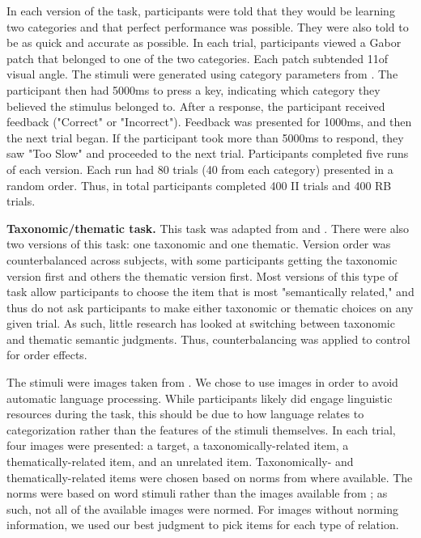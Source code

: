 \documentclass[../dissertation.tex]{subfiles}
\begin{document}
In each version of the task, participants were told that they would be learning two categories and that perfect performance was possible. They were also told to be as quick and accurate as possible. In each trial, participants viewed a Gabor patch that belonged to one of the two categories. Each patch subtended 11\degree of visual angle. The stimuli were generated using category parameters from \citet{Maddox2003}. The participant then had 5000ms to press a key, indicating which category they believed the stimulus belonged to. After a response, the participant received feedback ("Correct" or "Incorrect"). Feedback was presented for 1000ms, and then the next trial began. If the participant took more than 5000ms to respond, they saw "Too Slow" and proceeded to the next trial. Participants completed five runs of each version. Each run had 80 trials (40 from each category) presented in a random order. Thus, in total participants completed 400 II trials and 400 RB trials. \par
\textbf{Taxonomic/thematic task.} This task was adapted from \citet{Murphy2001} and \citet{Kalenine2009}. There were also two versions of this task: one taxonomic and one thematic. Version order was counterbalanced across subjects, with some participants getting the taxonomic version first and others the thematic version first. Most versions of this type of task allow participants to choose the item that is most "semantically related," and thus do not ask participants to make either taxonomic or thematic choices on any given trial. As such, little research has looked at switching between taxonomic and thematic semantic judgments. Thus, counterbalancing was applied to control for order effects. \par
The stimuli were images taken from \citet{Konkle2010}. We chose to use images in order to avoid automatic language processing. While participants likely did engage linguistic resources during the task, this should be due to how language relates to categorization rather than the features of the stimuli themselves. In each trial, four images were presented: a target, a taxonomically-related item, a thematically-related item, and an unrelated item. Taxonomically- and thematically-related items were chosen based on norms from \citet{Landrigan2016} where available. The \citet{Landrigan2016} norms were based on word stimuli rather than the images available from \citet{Konkle2010}; as such, not all of the available images were normed. For images without norming information, we used our best judgment to pick items for each type of relation. \par
\end{document}
